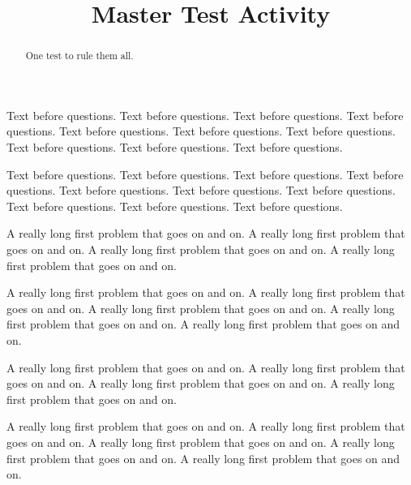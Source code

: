 \documentclass{ximera}
\title{Master Test Activity}
\begin{document}
\begin{abstract}
  One test to rule them all.
\end{abstract}

Text before questions. Text before questions. Text before questions. Text before questions. Text before questions. Text before questions. Text before questions. Text before questions. Text before questions. Text before questions. 

Text before questions. Text before questions. Text before questions. Text before questions. Text before questions. Text before questions. Text before questions. Text before questions. Text before questions. Text before questions. 

\begin{question}
	A really long first problem that goes on and on.  A really long first problem that goes on and on.  A really long first problem that goes on and on.  A really long first problem that goes on and on.  
	
	A really long first problem that goes on and on.  A really long first problem that goes on and on.  A really long first problem that goes on and on.  A really long first problem that goes on and on.  A really long first problem that goes on and on.  
	
\end{question}

\begin{question}
	A really long first problem that goes on and on.  A really long first problem that goes on and on.  A really long first problem that goes on and on.  A really long first problem that goes on and on.  
	
	A really long first problem that goes on and on.  A really long first problem that goes on and on.  A really long first problem that goes on and on.  A really long first problem that goes on and on.  A really long first problem that goes on and on.  
	
\end{question}
\end{document}
